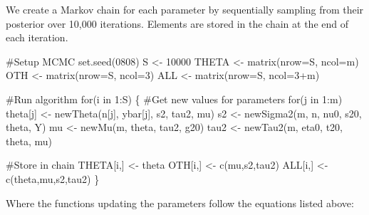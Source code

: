 \documentclass[]{article}
\newenvironment{Shaded}{\begin{snugshade}}{\end{snugshade}}
\newcommand{\KeywordTok}[1]{\textcolor[rgb]{0.94,0.87,0.69}{{#1}}}
\newcommand{\DataTypeTok}[1]{\textcolor[rgb]{0.87,0.87,0.75}{{#1}}}
\newcommand{\DecValTok}[1]{\textcolor[rgb]{0.86,0.86,0.80}{{#1}}}
\newcommand{\StringTok}[1]{\textcolor[rgb]{0.80,0.58,0.58}{{#1}}}
\newcommand{\CommentTok}[1]{\textcolor[rgb]{0.50,0.62,0.50}{{#1}}}
\newcommand{\NormalTok}[1]{\textcolor[rgb]{0.80,0.80,0.80}{{#1}}}
\begin{document}
We create a Markov chain for each parameter by sequentially sampling
from their posterior over 10,000 iterations. Elements are stored in the
chain at the end of each iteration.

\begin{Shaded}
\begin{Highlighting}[]
\CommentTok{#Setup MCMC}
\KeywordTok{set.seed}\NormalTok{(}\DecValTok{0808}\NormalTok{)}
\NormalTok{S <-}\StringTok{ }\DecValTok{10000}
\NormalTok{THETA <-}\StringTok{ }\KeywordTok{matrix}\NormalTok{(}\DataTypeTok{nrow=}\NormalTok{S, }\DataTypeTok{ncol=}\NormalTok{m)}
\NormalTok{OTH <-}\StringTok{ }\KeywordTok{matrix}\NormalTok{(}\DataTypeTok{nrow=}\NormalTok{S, }\DataTypeTok{ncol=}\DecValTok{3}\NormalTok{)}
\NormalTok{ALL <-}\StringTok{ }\KeywordTok{matrix}\NormalTok{(}\DataTypeTok{nrow=}\NormalTok{S, }\DataTypeTok{ncol=}\DecValTok{3}\NormalTok{+m)}

\CommentTok{#Run algorithm}
\NormalTok{for(i in }\DecValTok{1}\NormalTok{:S)}
\NormalTok{\{}
  \CommentTok{#Get new values for parameters}
  \NormalTok{for(j in }\DecValTok{1}\NormalTok{:m) theta[j] <-}\StringTok{ }\KeywordTok{newTheta}\NormalTok{(n[j], ybar[j], s2, tau2, mu)}
  \NormalTok{s2 <-}\StringTok{ }\KeywordTok{newSigma2}\NormalTok{(m, n, nu0, s20, theta, Y)}
  \NormalTok{mu <-}\StringTok{ }\KeywordTok{newMu}\NormalTok{(m, theta, tau2, g20)}
  \NormalTok{tau2 <-}\StringTok{ }\KeywordTok{newTau2}\NormalTok{(m, eta0, t20, theta, mu)}
  
  \CommentTok{#Store in chain}
  \NormalTok{THETA[i,] <-}\StringTok{ }\NormalTok{theta}
  \NormalTok{OTH[i,] <-}\StringTok{ }\KeywordTok{c}\NormalTok{(mu,s2,tau2)}
  \NormalTok{ALL[i,] <-}\StringTok{ }\KeywordTok{c}\NormalTok{(theta,mu,s2,tau2)}
\NormalTok{\}}
\end{Highlighting}
\end{Shaded}

Where the functions updating the parameters follow the equations listed
above:
\end{document}
